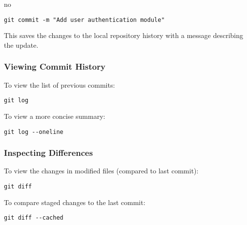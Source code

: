 no\documentclass{article}
\begin{document}
\begin{tcolorbox}[colback=mintgreen, colframe=green!40!black, boxrule=0.5pt, sharp corners]
\begin{verbatim}
git commit -m "Add user authentication module"
\end{verbatim}
\end{tcolorbox}

\noindent This saves the changes to the local repository history with a message describing the update.

\subsubsection{Viewing Commit History}

To view the list of previous commits:

\begin{tcolorbox}[colback=mintgreen, colframe=green!40!black, boxrule=0.5pt, sharp corners]
\begin{verbatim}
git log
\end{verbatim}
\end{tcolorbox}

\noindent To view a more concise summary:

\begin{tcolorbox}[colback=mintgreen, colframe=green!40!black, boxrule=0.5pt, sharp corners]
\begin{verbatim}
git log --oneline
\end{verbatim}
\end{tcolorbox}

\subsubsection{Inspecting Differences}

To view the changes in modified files (compared to last commit):

\begin{tcolorbox}[colback=mintgreen, colframe=green!40!black, boxrule=0.5pt, sharp corners]
\begin{verbatim}
git diff
\end{verbatim}
\end{tcolorbox}

\noindent To compare staged changes to the last commit:

\begin{tcolorbox}[colback=mintgreen, colframe=green!40!black, boxrule=0.5pt, sharp corners]
\begin{verbatim}
git diff --cached
\end{verbatim}
\end{tcolorbox}
\end{document}
